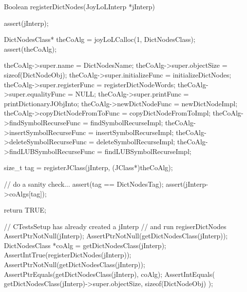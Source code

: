 \startCCode
Boolean registerDictNodes(JoyLoLInterp *jInterp) {
  assert(jInterp);
  
  DictNodesClass* theCoAlg =
    joyLoLCalloc(1, DictNodesClass);
  assert(theCoAlg);
  
  theCoAlg->super.name             = DictNodesName;
  theCoAlg->super.objectSize       = sizeof(DictNodeObj);
  theCoAlg->super.initializeFunc   = initializeDictNodes;
  theCoAlg->super.registerFunc     = registerDictNodeWords;
  theCoAlg->super.equalityFunc     = NULL;
  theCoAlg->super.printFunc        = printDictionaryJObjInto;
  theCoAlg->newDictNodeFunc        = newDictNodeImpl;
  theCoAlg->copyDictNodeFromToFunc = copyDictNodeFromToImpl;
  theCoAlg->findSymbolRecurseFunc  = findSymbolRecurseImpl;
  theCoAlg->insertSymbolRecurseFunc =
    insertSymbolRecurseImpl;
  theCoAlg->deleteSymbolRecurseFunc =
    deleteSymbolRecurseImpl;
  theCoAlg->findLUBSymbolRecurseFunc =
    findLUBSymbolRecurseImpl;

  size_t tag =
    registerJClass(jInterp, (JClass*)theCoAlg);
  
  // do a sanity check...
  assert(tag == DictNodesTag);
  assert(jInterp->coAlgs[tag]);
    
  return TRUE;
}
\stopCCode


\startCTest
  // CTestsSetup has already created a jInterp
  // and run regiserDictNodes
  AssertPtrNotNull(jInterp);
  AssertPtrNotNull(getDictNodesClass(jInterp));
  DictNodesClass *coAlg =
    getDictNodesClass(jInterp);
  AssertIntTrue(registerDictNodes(jInterp));
  AssertPtrNotNull(getDictNodesClass(jInterp));
  AssertPtrEquals(getDictNodesClass(jInterp), coAlg);
  AssertIntEquals(
    getDictNodesClass(jInterp)->super.objectSize, 
    sizeof(DictNodeObj)
  );
\stopCTest
\stopTestCase
\stopTestSuite

